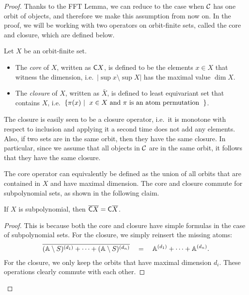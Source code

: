 \begin{proof}
    Thanks to the FFT Lemma, we can reduce to the case when ${\mathcal C}$ has one orbit of objects, and therefore we make this assumption from now on. In the proof, we will be working with two operators on orbit-finite sets, called the core and closure, which are defined below. 

    \begin{definition}
        Let $X$ be an orbit-finite set. 
        \begin{itemize}
            \item The \emph{core} of $X$, written as $\mathsf C X$,  is defined to be the elements $x \in X$ that witness the dimension, i.e.~$|\sup x \setminus \sup X|$ has the maximal value $\dim X$.
            \item The \emph{closure} of $X$, written as $\bar X$, is defined to least equivariant set that contains $X$, i.e.~$\setbuild{ \pi(x)}{$x \in X$ and $\pi$ is an atom permutation}$.
        \end{itemize}
    \end{definition}
    The closure is easily seen to be a closure operator, i.e.~it is monotone with respect to inclusion and applying it a second time does not add any elements. Also, if two sets are in the same orbit, then they have the same closure. In particular, since we assume that all objects in ${\mathcal C}$ are in the same orbit, it follows that they have the same closure. 

    The core operator can equivalently be defined as the union of all orbits that are contained in $X$ and have maximal dimension. The core and closure commute  for subpolynomial sets, as shown in the following claim.

    \begin{claim}\label{claim:core-closure-commute}
        If $X$ is subpolynomial, then
        $ \overline{\mathsf C X} = \mathsf C \overline X$.
    \end{claim}
    \begin{proof}
        This is because both the core and closure have simple formulas in the case of subpolynomial sets. For the closure, we simply reinsert the missing atoms: 
        \begin{align*}
        \overline{
            (\mathbb A \setminus S)^{(d_1)} + \cdots + (\mathbb A \setminus S)^{(d_n)}
        } 
        \quad = \quad 
        \mathbb A^{(d_1)} + \cdots + \mathbb A^{(d_n)}.
        \end{align*}
        For the closure, we only keep the orbits that have maximal dimension $d_i$. These operations clearly commute with each other. 
    \end{proof}
    

\end{proof}
